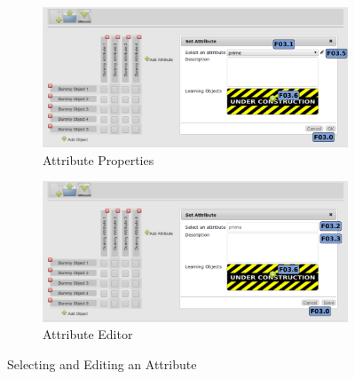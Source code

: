 \documentclass[a4paper,11pt]{article}
\begin{document}
\begin{figure}[h]
\begin{center}
  \begin{subfigure}{0.8 \textwidth}
    \begin{center}
    \includegraphics[width=\textwidth]{figures/attr_sow}
    \caption{Attribute Properties}
    \label{fig:fca-attr-show}
    \end{center}
  \end{subfigure}
  \begin{subfigure}{0.8 \textwidth}
    \begin{center}
    \includegraphics[width=\textwidth]{figures/attr_edit}
    \caption{Attribute Editor}
    \label{fig:fca-attr-edit}
    \end{center}
  \end{subfigure}
\end{center}
\caption{Selecting and Editing an Attribute}
\end{figure}
\end{document}
